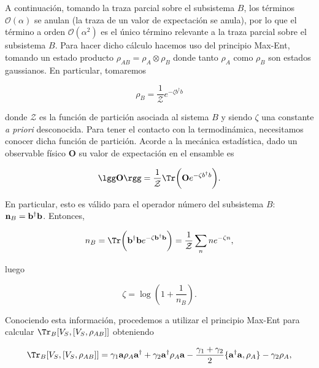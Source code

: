 A continuación, tomando la traza parcial sobre el subsistema $B$, los términos $\mathcal{O}(\alpha)$ se anulan (la traza de un valor de expectación se anula), por lo que el término a orden $\mathcal{O}(\alpha^2)$ es el único término relevante a la traza parcial sobre el subsistema $B$. Para hacer dicho cálculo hacemos uso del principio Max-Ent, tomando un estado producto $\rho_{AB} = \rho_{A} \otimes \rho_B$ donde tanto $\rho_A$ como $\rho_B$ son estados gaussianos. En particular, tomaremos

\begin{equation}
\rho_{B} = \frac{1}{\mathcal{Z}} e^{-\zeta b^{\dagger}b }
\label{model1_rhoB}
\end{equation}

donde $\mathcal{Z}$ es la función de partición asociada al sistema $B$ y siendo $\zeta$ una constante \textit{a priori} desconocida. Para tener el contacto con la termodinámica, necesitamos conocer dicha función de partición. Acorde a la mecánica estadística, dado un observable físico $\mathbf{O}$ su valor de expectación en el ensamble es 

\begin{equation}
    \lgg \mathbf{O} \rgg = \frac{1}{\mathcal{Z}}\Tr \bigg(\mathbf{O}e^{-\zeta b^{\dagger}b }\bigg).
\end{equation}

En particular, esto es válido para el operador número del subsistema $B$: $\mathbf{n}_B = {\bf b}^{\dagger}{\bf b}$. Entonces,

\begin{equation}
    n_B = \Tr\bigg({\bf b}^{\dagger}{\bf b}e^{-\zeta {\bf b}^{\dagger}{\bf b} }\bigg) = \frac{1}{\mathcal{Z}} \sum_{n} n e^{-\zeta n} ,
\end{equation}

luego

\begin{equation}
    \zeta = \log \left(1 + \frac{1}{n_B}\right).
\end{equation}

Conociendo esta información, procedemos a utilizar el principio Max-Ent para calcular $\Tr_{B} [V_S,[V_S,\rho_{AB}]]$ obteniendo

\begin{equation}
\Tr_{B} [V_S,[V_S,\rho_{AB}]] = \gamma_1 {\bf a}\rho_{A} {\bf a}^{\dagger} + \gamma_2 {\bf a}^{\dagger} \rho_{A}{\bf a} - \frac{\gamma_1 + \gamma_2}{2} \{{\bf a}^{\dagger}{\bf a},\rho_{A}\} - \gamma_2 \rho_{A},  
\label{Lindblad model1}
\end{equation}

